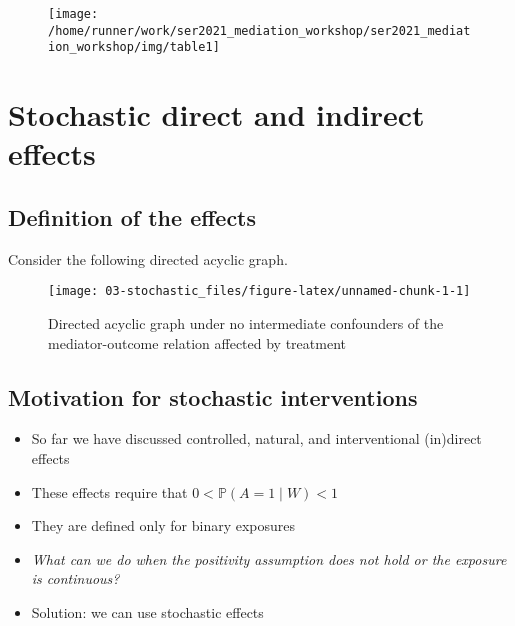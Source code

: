 \documentclass[
  12pt,
]{book}
\providecommand{\tightlist}{%
  \setlength{\itemsep}{0pt}\setlength{\parskip}{0pt}}
\theoremstyle{definition}
\theoremstyle{definition}
\theoremstyle{definition}
\renewcommand{\P}{\mathbb{P}}
\newcommand{\1}{\mathbbm{1}}
\begin{document}
\begin{figure}

{\centering \texttt{[image: /home/runner/work/ser2021\_mediation\_workshop/ser2021\_mediation\_workshop/img/table1]} 

}

\end{figure}

\hypertarget{stochastic}{%
\chapter{Stochastic direct and indirect effects}\label{stochastic}}

\hypertarget{definition-of-the-effects}{%
\section{Definition of the effects}\label{definition-of-the-effects}}

Consider the following directed acyclic graph.

\begin{figure}

{\centering \texttt{[image: 03-stochastic\_files/figure-latex/unnamed-chunk-1-1]} 

}

\caption{Directed acyclic graph under no intermediate confounders of the mediator-outcome relation affected by treatment}\label{fig:unnamed-chunk-1}
\end{figure}

\hypertarget{motivation-for-stochastic-interventions}{%
\section{Motivation for stochastic interventions}\label{motivation-for-stochastic-interventions}}

\begin{itemize}
\tightlist
\item
  So far we have discussed controlled, natural, and interventional (in)direct effects
\item
  These effects require that \(0 < \P(A=1\mid W) < 1\)
\item
  They are defined only for binary exposures
\item
  \emph{What can we do when the positivity assumption does not hold or the exposure
  is continuous?}
\item
  Solution: we can use stochastic effects
\end{itemize}
\end{document}
